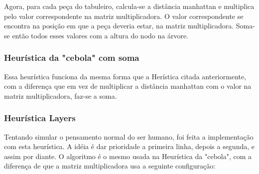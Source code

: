 \documentclass[a4paper,11pt]{article}
\begin{document}
Agora, para cada peça do tabuleiro, calcula-se a distância manhattan e multiplica pelo valor correspondente na matriz multiplicadora. O valor correspondente se encontra
na posição em que a peça deveria estar, na matriz multiplicadora. Soma-se então todos esses valores com a altura do nodo na árvore.

\subsubsection {Heurística da "cebola" com soma}
Essa heurística funciona da mesma forma que a Herística citada anteriormente, com a diferença que em vez de multiplicar a distância manhattan com o valor na matriz multiplicadora, faz-se a soma.

\subsubsection {Heurística Layers}
Tentando simular o pensamento normal do ser humano, foi feita a implementação com esta heurística.
A idéia é dar prioridade a primeira linha, depois a segunda, e assim por diante.
O algoritmo é o mesmo usada na Heurística da "cebola", com a diferença de que a matriz multiplicadora usa a seguinte configuração:
\end{document}
